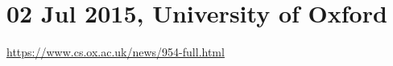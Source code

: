\documentclass{deliverablereport}
\begin{document}
\clearpage

\section{02 Jul 2015, University of Oxford}

\url{https://www.cs.ox.ac.uk/news/954-full.html}

\medskip
\end{document}
